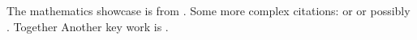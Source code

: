 \documentclass{article}
\begin{document}
 The mathematics showcase is from \autocite{Graham1995}.
 Some more complex citations: \parencite{Graham1995} or
 \textcite{Thomas2008} or possibly .
 \autocite[56]{Thomas2008}
 \autocite[See][45-48]{Graham1995}
 Together \autocite{Thomas2008,Graham1995}
Another key work is \textcite{Knuth1984}.
 \printbibliography
 
\end{document}

